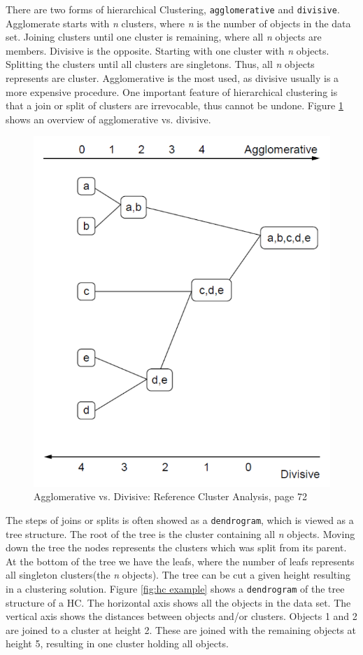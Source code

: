 \documentclass[a4paper,10pt]{article}
\theoremstyle{plain}
\theoremstyle{definition}
\begin{document}
There are two forms of hierarchical Clustering, \texttt{agglomerative} and \texttt{divisive}. Agglomerate starts with \textit{n} clusters, where \textit{n} is the number of objects in the data set. Joining clusters until one cluster is remaining, where all \textit{n} objects are members. Divisive is the opposite. Starting with one cluster with \textit{n} objects. Splitting the clusters until all clusters are singletons. Thus, all \textit{n} objects represents are cluster. Agglomerative is the most used, as divisive usually is a more expensive procedure. One important feature of hierarchical clustering is that a join or split of clusters are irrevocable, thus cannot be undone. Figure \ref{fig:agglo_vs_div} shows an overview of agglomerative vs. divisive.
\begin{figure}[H]
	\centering
	\includegraphics*[scale=0.3]{./pictures/hc/agglo_vs_div.png}
	\caption{Agglomerative vs. Divisive: Reference Cluster Analysis, page 72}
	\label{fig:agglo_vs_div}
\end{figure} 
The steps of joins or splits is often showed as a \texttt{dendrogram}, which is viewed as a tree structure. The root of the tree is the cluster containing all \textit{n} objects. Moving down the tree the nodes represents the clusters which was split from its parent. At the bottom of the tree we have the leafs, where the number of leafs represents all singleton clusters(the \textit{n} objects). The tree can be cut a given height resulting in a clustering solution. Figure \ref{fig:hc example} shows a \texttt{dendrogram} of the tree structure of a HC. The horizontal axis shows all the objects in the data set. The vertical axis shows the distances between objects and/or clusters. Objects 1 and 2 are joined to a cluster at height 2. These are joined with the remaining objects at height 5, resulting in one cluster holding all objects.
\end{document}
